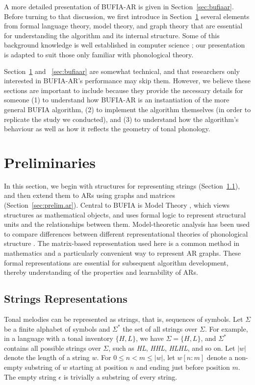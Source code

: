 \documentclass{CUP-JNL-PHO}%
\theoremstyle{definition}
\numberwithin{equation}{section}
\theoremstyle{definition}
\begin{document}
A more detailed presentation of BUFIA-AR is given in Section~\ref{sec:bufiaar}. 
Before turning to that discussion, we first introduce in Section~\ref{sec:prelim} 
several elements from formal language theory, model theory, and graph theory 
that are essential for understanding the algorithm and its internal structure.  
Some of this background knowledge is well established in computer science 
\citep{CLRS2022,west2001introduction}; our presentation is adapted to suit 
those only familiar with phonological theory. 

Section~\ref{sec:prelim} and ~\ref{sec:bufiaar} are
somewhat technical, and that researchers only interested in BUFIA-AR's
performance may skip them. However, we
believe these sections are important to include because they provide
the necessary details for someone (1) to understand how BUFIA-AR is an
instantiation of the more general BUFIA algorithm, (2) to implement
the algorithm themselves (in order to replicate the study we
conducted), and (3) to understand how the algorithm's behaviour as well
as how it reflects the geometry of tonal phonology.

\section{Preliminaries} \label{sec:prelim} 

In this section, we begin with structures for representing strings
(Section~\ref{sec:prelim.string}), and then extend them to ARs using
graphs and matrices (Section~\ref{sec:prelim.ar}). Central to BUFIA is
Model Theory \citep{enderton2001mathematical}, which views structures
as mathematical objects, and uses formal logic to represent structural
units and the relationships between them. Model-theoretic analysis has
been used to compare differences between different representational
theories of phonological structure
\citep{strother-garciaUsingModelTheory,
	oakdenNotationalEquivalenceTonal2020, jardineetal20qtheoryAP}.  The
matrix-based representation used here is a common method in
mathematics and a particularly convenient way to represent AR
graphs. These formal representations are essential for subsequent
algorithm development, thereby understanding of the properties and
learnability of ARs.

\subsection{Strings Representations}\label{sec:prelim.string}
Tonal melodies can be represented as strings, that is, sequences of
symbols.  Let $\Sigma$ be a finite alphabet of symbols and $\Sigma^*$
the set of all strings over $\Sigma$. For example, in a language with
a tonal inventory $\{H, L\}$, we have $\Sigma = \{H, L\}$, and
$\Sigma^*$ contains all possible strings over $\Sigma$, such as
\textit{HL}, \textit{HHL}, \textit{HLHL}, and so on. Let $|w|$ 
denote the length of a string $w$. For $0 \le n < m \le |w|$,
let $w[n:m]$ denote a non-empty substring of $w$
starting at position $n$ and ending just before position $m$.
The empty string $\epsilon$ is trivially a substring of every string.
\end{document}
